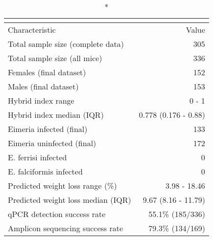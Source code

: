 \begin{longtable}{lr}
\caption*{
{\large }
} \\ 
\toprule
Characteristic & Value \\ 
\midrule\addlinespace[2.5pt]
Total sample size (complete data) & 305 \\ 
Total sample size (all mice) & 336 \\ 
Females (final dataset) & 152 \\ 
Males (final dataset) & 153 \\ 
Hybrid index range & 0 - 1 \\ 
Hybrid index median (IQR) & 0.778 (0.176 - 0.88) \\ 
Eimeria infected (final) & 133 \\ 
Eimeria uninfected (final) & 172 \\ 
E. ferrisi infected & 0 \\ 
E. falciformis infected & 0 \\ 
Predicted weight loss range (\%) & 3.98 - 18.46 \\ 
Predicted weight loss median (IQR) & 9.67 (8.16 - 11.79) \\ 
qPCR detection success rate & 55.1\% (185/336) \\ 
Amplicon sequencing success rate & 79.3\% (134/169) \\ 
\bottomrule
\end{longtable}

